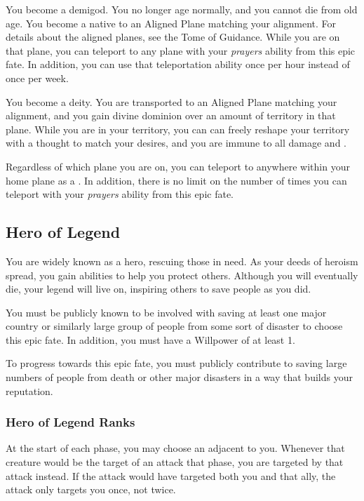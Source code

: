              You become a demigod.
            You no longer age normally, and you cannot die from old age.
            You become a  native to an Aligned Plane matching your alignment.
            For details about the aligned planes, see the Tome of Guidance.
            While you are on that plane, you can teleport to any plane with your \textit{prayers} ability from this epic fate.
            In addition, you can use that teleportation ability once per hour instead of once per week.

             You become a deity.
            You are transported to an Aligned Plane matching your alignment, and you gain divine dominion over an amount of territory in that plane.
            While you are in your territory, you can can freely reshape your territory with a thought to match your desires, and you are immune to all damage and .

            Regardless of which plane you are on, you can teleport to anywhere within your home plane as a .
            In addition, there is no limit on the number of times you can teleport with your \textit{prayers} ability from this epic fate.

    \subsection{Hero of Legend}
        You are widely known as a hero, rescuing those in need.
        As your deeds of heroism spread, you gain abilities to help you protect others.
        Although you will eventually die, your legend will live on, inspiring others to save people as you did.

         You must be publicly known to be involved with saving at least one major country or similarly large group of people from some sort of disaster to choose this epic fate.
        In addition, you must have a Willpower of at least 1.

         To progress towards this epic fate, you must publicly contribute to saving large numbers of people from death or other major disasters in a way that builds your reputation.

        \subsubsection{Hero of Legend Ranks}
             At the start of each phase, you may choose an  adjacent to you.
            Whenever that creature would be the target of an attack that phase, you are targeted by that attack instead.
            If the attack would have targeted both you and that ally, the attack only targets you once, not twice.

